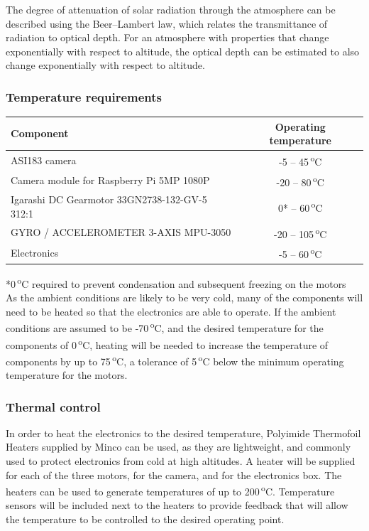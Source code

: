 The degree of attenuation of solar radiation through the atmosphere can be described using the Beer–Lambert law, which relates the transmittance of radiation to optical depth. For an atmosphere with properties that change exponentially with respect to altitude, the optical depth can be estimated to also change exponentially with respect to altitude. \


\subsubsection{Temperature requirements}

\begin{center}
  \begin{tabular}{ | l | c | }
    \hline
    \textbf{Component} & \textbf{Operating temperature} \\ \hline
    ASI183 camera  & -5 – 45\,\textsuperscript{o}C \\ \hline
    Camera module for Raspberry Pi 5MP 1080P & -20 – 80\,\textsuperscript{o}C \\ \hline
    Igarashi DC Gearmotor 33GN2738-132-GV-5 312:1  & 0* – 60\,\textsuperscript{o}C \\ \hline
    GYRO / ACCELEROMETER 3-AXIS  MPU-3050 & -20 – 105\,\textsuperscript{o}C \\ \hline
    Electronics  & -5 – 60\,\textsuperscript{o}C \\ \hline
  \end{tabular}
\end{center}

*0\,\textsuperscript{o}C required to prevent condensation and subsequent freezing on the motors\\

As the ambient conditions are likely to be very cold, many of the components will need to be heated so that the electronics are able to operate. If the ambient conditions are assumed to be -70\,\textsuperscript{o}C, and the desired temperature for the components of 0\,\textsuperscript{o}C, heating will be needed to increase the temperature of components by up to  75\,\textsuperscript{o}C, a tolerance of 5\,\textsuperscript{o}C below the minimum operating temperature for the motors.\

\subsubsection{Thermal control}
In order to heat the electronics to the desired temperature, Polyimide Thermofoil Heaters supplied by Minco can be used, as they are lightweight, and commonly used to protect electronics from cold at high altitudes. A heater will be supplied for each of the three motors, for the camera, and for the electronics box. The heaters can be used to generate temperatures of up to 200\,\textsuperscript{o}C. Temperature sensors will be included next to the heaters to provide feedback that will allow the temperature to be controlled to the desired operating point. \\

